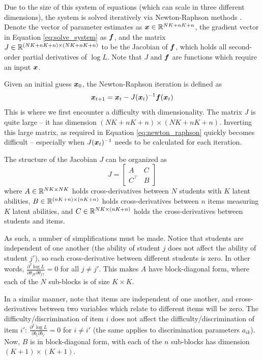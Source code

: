 Due to the size of this system of equations (which can scale in three different dimensions), the system is solved iteratively via Newton-Raphson methods \cite{ben_israel1966}. Denote the vector of parameter estimates as $\boldsymbol{x} \in \mathbb{R}^{NK+nK+n}$, the gradient vector in Equation \ref{eq:solve_system} as $\boldsymbol{f}$, and the matrix $J\in \mathbb{R}^{(NK + nK +n) \times(NK + nK + n)}$ to be the Jacobian of $\boldsymbol{f}$, which holds all second-order partial derivatives of $\log L$. Note that $J$ and $\boldsymbol{f}$ are functions which require an input $\boldsymbol{x}$.

Given an initial guess $\boldsymbol{x}_0$, the Newton-Raphson iteration is defined as
\begin{equation}
  \boldsymbol{x}_{t+1} = \boldsymbol{x}_t - J(\boldsymbol{x}_t)^{-1} \boldsymbol{f}(\boldsymbol{x}_t)
  \label{eq:newton_raphson}
\end{equation}
This is where we first encounter a difficulty with dimensionality. The matrix $J$ is quite large -- it has dimension $(NK+nK+n) \times (NK+nK+n)$. Inverting this large matrix, as required in Equation \ref{eq:newton_raphson} quickly becomes difficult -- especially when $J(\boldsymbol{x}_t)^{-1}$ needs to be calculated for each iteration.

The structure of the Jacobian $J$ can be organized as
\begin{equation}
  J = \begin{bmatrix}
    A & C \\
    C^\top & B
  \end{bmatrix}
  \label{eq:jacobian_blocks}
\end{equation}
where $A \in \mathbb{R}^{NK \times NK}$ holds cross-derivatives between $N$ students with $K$ latent abilities, $B \in \mathbb{R}^{(nK+n) \times (nK+n)}$ holds cross-derivatives between $n$ items measuring $K$ latent abilities, and $C \in \mathbb{R}^{NK \times (nK+n)}$ holds the cross-derivatives between students and items.

As such, a number of simplifications must be made. Notice that students are independent of one another (the ability of student $j$ does not affect the ability of student $j'$), so each cross-derivative between different students is zero. In other words, $\frac{\partial^2 \log L}{\partial\theta_{j k} \partial \theta_{j' l}} = 0$ for all $j \not= j'$. This makes $A$ have block-diagonal form, where each of the $N$ sub-blocks is of size $K\times K$. 

In a similar manner, note that items are independent of one another, and cross-derivatives between two variables which relate to different items will be zero. The difficulty/discrimination of item $i$ does not affect the difficulty/discrimination of item $i'$: $\frac{\partial^2 \log L}{\partial b_{i} \partial b_{i'}} = 0$ for $i \not = i'$ (the same applies to discrimination parameters $a_{ik}$). Now, $B$ is in block-diagonal form, with each of the $n$ sub-blocks has dimension $(K+1) \times (K+1)$. 

